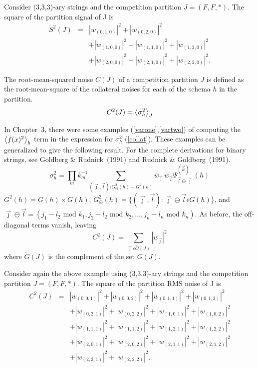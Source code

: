 \begin{example}
Consider (3,3,3)-ary strings and the competition partition $J=(F,F,*)$.
The square of the partition signal of J is
\begin{eqnarray}
S^2(J)&=& |w_{(0,1,0)}|^2 + |w_{(0,2,0)}|^2\nonumber\\
	&&+ |w_{(1,0,0)}|^2 + |w_{(1,1,0)}|^2+ |w_{(1,2,0)}|^2
		\nonumber\\
	&&+ |w_{(2,0,0)}|^2 + |w_{(2,1,0)}|^2+ |w_{(2,2,0)}|^2.
\end{eqnarray}
\end{example}
\begin{definition}
The root-mean-squared noise $C(J)$ of a competition partition $J$ is
defined as the
root-mean-square of the collateral noises for each of the
schema $h$ in the partition.
\begin{equation}
C^2(J)={\left\langle \sigma_h^2 \right\rangle}_J
\end{equation}
\end{definition}
In Chapter~3, there were some examples (\ref{varone},\ref{vartwo})
of computing the ${\left\langle f(x)^2 \right\rangle}_h$ term in the expression for
$\sigma_h^2$ (\ref{collat}).  These examples can be generalized
to give the following result.
For the complete derivations for binary strings, see
Goldberg \& Rudnick~(1991) and Rudnick \& Goldberg~(1991).
\begin{equation}
\sigma_h^2=\prod_m{k_m^{-1}}\sum_{(\vec\jmath,\vec l)\epsilon G^2_{\ominus}(h)-G^2(h)}{
\overline{w}_{\vec\jmath}\, w_{\vec l}
\Psi^{(\vec k)}_{\vec l \ominus \vec\jmath}(h)}
\end{equation}
$G^2(h)=G(h)\times G(h)$, $G^2_{\ominus}(h)=\{(\vec\jmath,\vec l):\vec \jmath
	\ominus \vec l \epsilon G(h)\}$, and $\vec\jmath\ominus\vec l=
	(j_1-l_2 \mbox{\ mod\ }k_1,j_2-l_2 \mbox{\ mod\ }k_2,\ldots,
		j_n-l_n \mbox{\ mod\ }k_n)$.
As before, the off-diagonal terms vanish, leaving
\begin{equation}
C^2(J)=\sum_{\vec\jmath\epsilon\tilde{G}(J)}{|w_{\vec\jmath}|^2}
\end{equation}
where $\tilde{G}(J)$ is the complement of the set $G(J)$.

\begin{example}
Consider again the above example using
(3,3,3)-ary strings and the competition partition $J=(F,F,*)$.
The square of the partition RMS noise of J is
\begin{eqnarray}
C^2(J)&=& |w_{(0,0,1)}|^2 + |w_{(0,0,2)}|^2 + |w_{(0,1,1)}|^2+|w_{(0,1,2)}|^2\nonumber\\
        &&+ |w_{(0,2,1)}|^2 + |w_{(0,2,2)}|^2+ |w_{(1,0,1)}|^2+|w_{(1,0,2)}|^2
                \nonumber\\
        &&+ |w_{(1,1,1)}|^2 + |w_{(1,1,2)}|^2+ |w_{(1,2,1)}|^2+|w_{(1,2,2)}|^2
                \nonumber\\
        &&+ |w_{(2,0,1)}|^2 + |w_{(2,0,2)}|^2+ |w_{(2,1,1)}|^2+|w_{(2,1,2)}|^2
                \nonumber\\
        &&+ |w_{(2,2,1)}|^2 + |w_{(2,2,2)}|^2.
\end{eqnarray}
\end{example}


